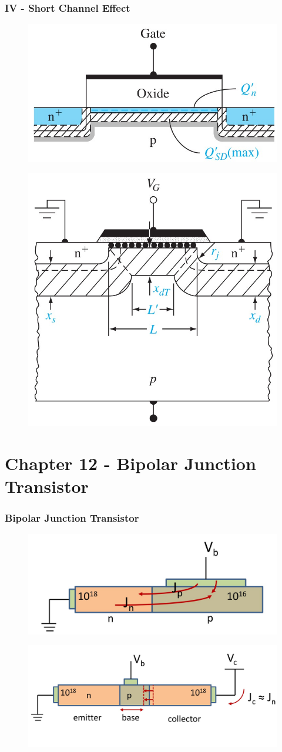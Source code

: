 \documentclass{beamer}
\begin{document}
    \begin{frame} \frametitle{IV - Short Channel Effect}
        \begin{figure}[H]
            \centering
            \includegraphics[width=0.4\linewidth]{Short-channel-effects-long-channel.jpg}
            \label{fig:Short-channel-effects-long-channel.jpg}
        \end{figure}
        \begin{figure}[H]
            \centering
            \includegraphics[width=0.5\linewidth]{Short-channel-effects.jpg}
            \label{fig:Short-channel-effects.jpg}
        \end{figure}
    \end{frame}

\section{Chapter 12 - Bipolar Junction Transistor}
    \begin{frame} \frametitle{Bipolar Junction Transistor}
        \begin{figure}[H]
            \centering
            \includegraphics[width=0.5\linewidth]{BJT-one-pn.jpg}
            \label{fig:BJT-one-pn.jpg}
        \end{figure}
        \begin{figure}[H]
            \centering
            \includegraphics[width=0.6\linewidth]{BJT-two-pn.jpg}
            \label{fig:BJT-two-pn.jpg}
        \end{figure}
    \end{frame}
\end{document}
